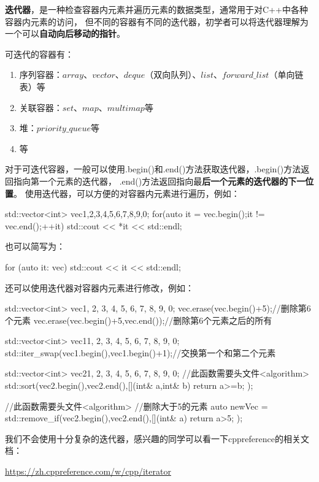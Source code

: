\textbf{迭代器}，是一种检查容器内元素并遍历元素的数据类型，通常用于对C++中各种容器内元素的访问，
但不同的容器有不同的迭代器，初学者可以将迭代器理解为一个可以\textbf{自动向后移动的指针}。

可迭代的容器有：

\begin{enumerate}
    \item 序列容器：$array$、$vector$、$deque$（双向队列）、$list$、$forward\_list$（单向链表）等
    \item 关联容器：$set$、$map$、$multimap$等
    \item 堆：$priority\_queue$等
    \item 等
\end{enumerate}
对于可迭代容器，一般可以使用.begin()和.end()方法获取迭代器，.begin()方法返回指向第一个元素的迭代器，
.end()方法返回指向最\textbf{后一个元素的迭代器的下一位置}。
使用迭代器，可以方便的对容器内元素进行遍历，例如：

\begin{tcode}
std::vector<int> vec{1,2,3,4,5,6,7,8,9,0};
for(auto it = vec.begin();it != vec.end();++it){
    std::cout << *it << std::endl;
}
\end{tcode}

也可以简写为：

\begin{tcode}
for (auto it: vec) {
    std::cout << it << std::endl;
}
\end{tcode}

还可以使用迭代器对容器内元素进行修改，例如：

\begin{tcode}
std::vector<int> vec{1, 2, 3, 4, 5, 6, 7, 8, 9, 0};
vec.erase(vec.begin()+5);//删除第6个元素
vec.erase(vec.begin()+5,vec.end());//删除第6个元素之后的所有

std::vector<int> vec1{1, 2, 3, 4, 5, 6, 7, 8, 9, 0};
std::iter_swap(vec1.begin(),vec1.begin()+1);//交换第一个和第二个元素

std::vector<int> vec2{1, 2, 3, 4, 5, 6, 7, 8, 9, 0};
//此函数需要头文件<algorithm>
std::sort(vec2.begin(),vec2.end(),[](int& a,int& b){
    return a>=b;
});

//此函数需要头文件<algorithm>
//删除大于5的元素
auto newVec = std::remove_if(vec2.begin(),vec2.end(),[](int& a){
    return a>5;
});
\end{tcode}

我们不会使用十分复杂的迭代器，感兴趣的同学可以看一下cppreference的相关文档：

\url{https://zh.cppreference.com/w/cpp/iterator}

